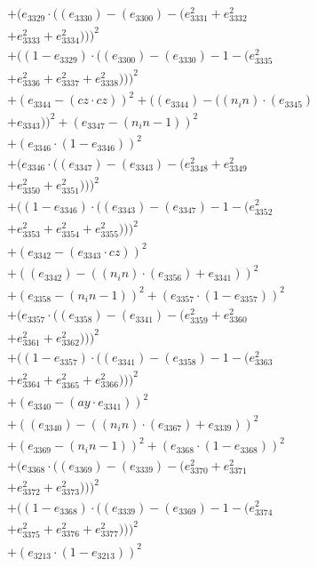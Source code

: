 \documentclass[10pt, a4paper]{article}
\begin{document}
\begin{small}
\begin{align*}
& + (e_{3329}  \cdot  ((e_{3330}) - (e_{3300}) - (e_{3331}^{2} + e_{3332}^{2} \\
& + e_{3333}^{2} + e_{3334}^{2})))^{2} \\
& + ((1 - e_{3329})  \cdot  ((e_{3300}) - (e_{3330}) - 1 - (e_{3335}^{2} \\
& + e_{3336}^{2} + e_{3337}^{2} + e_{3338}^{2})))^{2} \\
& + (e_{3344} - (cz  \cdot  cz))^{2} + ((e_{3344}) - ((n_in)  \cdot  (e_{3345}) \\
& + e_{3343}))^{2} + (e_{3347} - (n_in - 1))^{2} \\
& + (e_{3346}  \cdot  (1 - e_{3346}))^{2} \\
& + (e_{3346}  \cdot  ((e_{3347}) - (e_{3343}) - (e_{3348}^{2} + e_{3349}^{2} \\
& + e_{3350}^{2} + e_{3351}^{2})))^{2} \\
& + ((1 - e_{3346})  \cdot  ((e_{3343}) - (e_{3347}) - 1 - (e_{3352}^{2} \\
& + e_{3353}^{2} + e_{3354}^{2} + e_{3355}^{2})))^{2} \\
& + (e_{3342} - (e_{3343}  \cdot  cz))^{2} \\
& + ((e_{3342}) - ((n_in)  \cdot  (e_{3356}) + e_{3341}))^{2} \\
& + (e_{3358} - (n_in - 1))^{2} + (e_{3357}  \cdot  (1 - e_{3357}))^{2} \\
& + (e_{3357}  \cdot  ((e_{3358}) - (e_{3341}) - (e_{3359}^{2} + e_{3360}^{2} \\
& + e_{3361}^{2} + e_{3362}^{2})))^{2} \\
& + ((1 - e_{3357})  \cdot  ((e_{3341}) - (e_{3358}) - 1 - (e_{3363}^{2} \\
& + e_{3364}^{2} + e_{3365}^{2} + e_{3366}^{2})))^{2} \\
& + (e_{3340} - (ay  \cdot  e_{3341}))^{2} \\
& + ((e_{3340}) - ((n_in)  \cdot  (e_{3367}) + e_{3339}))^{2} \\
& + (e_{3369} - (n_in - 1))^{2} + (e_{3368}  \cdot  (1 - e_{3368}))^{2} \\
& + (e_{3368}  \cdot  ((e_{3369}) - (e_{3339}) - (e_{3370}^{2} + e_{3371}^{2} \\
& + e_{3372}^{2} + e_{3373}^{2})))^{2} \\
& + ((1 - e_{3368})  \cdot  ((e_{3339}) - (e_{3369}) - 1 - (e_{3374}^{2} \\
& + e_{3375}^{2} + e_{3376}^{2} + e_{3377}^{2})))^{2} \\
& + (e_{3213}  \cdot  (1 - e_{3213}))^{2} \\

\end{align*}
\end{small}
\end{document}
